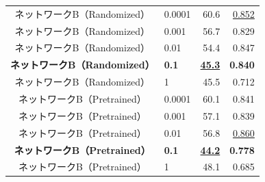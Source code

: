 \begin{table}[bt]
\begin{center}
{\begin{tabular}{|c|l|rr|}
                \hline
                ネットワークB（Randomized）          & 0.0001                                    & 60.6                         & \underline{0.852}          \\
                ネットワークB（Randomized）          & 0.001                                     & 56.7                         & 0.829                      \\
                ネットワークB（Randomized）          & 0.01                                      & 54.4                         & 0.847                      \\
                \textbf{ネットワークB（Randomized）} & \textbf{0.1}                              & \underline{\textbf{45.3}}    & \textbf{0.840}             \\
                ネットワークB（Randomized）          & 1                                         & 45.5                         & 0.712                      \\
                \hline
                ネットワークB（Pretrained）          & 0.0001                                    & 60.1                         & 0.841                      \\
                ネットワークB（Pretrained）          & 0.001                                     & 57.1                         & 0.839                      \\
                ネットワークB（Pretrained）          & 0.01                                      & 56.8                         & \underline{0.860}          \\
                \textbf{ネットワークB（Pretrained）} & \textbf{0.1}                              & \underline{\textbf{44.2}}    & \textbf{0.778}             \\
                ネットワークB（Pretrained）          & 1                                         & 48.1                         & 0.685                      \\
                \hline
            \end{tabular}
        }
    \end{center}
\end{table}

